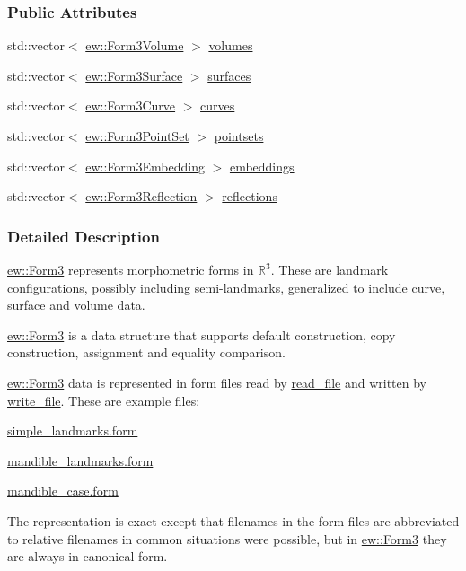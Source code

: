 \subsubsection*{Public Attributes}
\begin{DoxyCompactItemize}
\item 
std::vector$<$ \hyperlink{classew_1_1Form3Volume}{ew::Form3Volume} $>$ \hyperlink{classew_1_1Form3_aab5dcd7658c84512d05e095e58341fa7}{volumes}
\item 
std::vector$<$ \hyperlink{classew_1_1Form3Surface}{ew::Form3Surface} $>$ \hyperlink{classew_1_1Form3_abd4405612b484b5d9d87b643d316b020}{surfaces}
\item 
std::vector$<$ \hyperlink{classew_1_1Form3Curve}{ew::Form3Curve} $>$ \hyperlink{classew_1_1Form3_ab60def495fb8fea585dff2fb8c94d845}{curves}
\item 
std::vector$<$ \hyperlink{classew_1_1Form3PointSet}{ew::Form3PointSet} $>$ \hyperlink{classew_1_1Form3_aed0e94682a4de9b871c8fb15906bcc09}{pointsets}
\item 
std::vector$<$ \hyperlink{classew_1_1Form3Embedding}{ew::Form3Embedding} $>$ \hyperlink{classew_1_1Form3_a05ace76e2206ea825495538e93d9ba4c}{embeddings}
\item 
std::vector$<$ \hyperlink{classew_1_1Form3Reflection}{ew::Form3Reflection} $>$ \hyperlink{classew_1_1Form3_a4df1d049f2c5ca83f194d4ac9cf9f074}{reflections}
\end{DoxyCompactItemize}


\subsubsection{Detailed Description}
\hyperlink{classew_1_1Form3}{ew::Form3} represents morphometric forms in $\mathbb{R}^3$. These are landmark configurations, possibly including semi-\/landmarks, generalized to include curve, surface and volume data.

\hyperlink{classew_1_1Form3}{ew::Form3} is a data structure that supports default construction, copy construction, assignment and equality comparison.

\hyperlink{classew_1_1Form3}{ew::Form3} data is represented in form files read by \hyperlink{classew_1_1Form3_a9de2d04fa5fd964de69951339ed9c1cf}{read\_\-file} and written by \hyperlink{classew_1_1Form3_ab5abad2f912616bc7d0a1e3dd37943bb}{write\_\-file}. These are example files:
\begin{DoxyItemize}
\item \hyperlink{simple_landmarks_8form}{simple\_\-landmarks.form}
\item \hyperlink{mandible_template_8form}{mandible\_\-landmarks.form}
\item \hyperlink{mandible_case_8form}{mandible\_\-case.form}
\end{DoxyItemize}The representation is exact except that filenames in the form files are abbreviated to relative filenames in common situations were possible, but in \hyperlink{classew_1_1Form3}{ew::Form3} they are always in canonical form.

